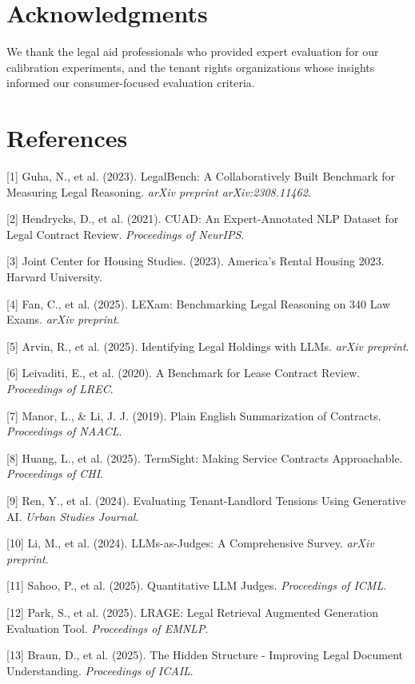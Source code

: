 \documentclass{article}
\begin{document}
\section*{Acknowledgments}

We thank the legal aid professionals who provided expert evaluation for our calibration experiments, and the tenant rights organizations whose insights informed our consumer-focused evaluation criteria.

\section*{References}

{
\small

[1] Guha, N., et al. (2023). LegalBench: A Collaboratively Built Benchmark for Measuring Legal Reasoning. \emph{arXiv preprint arXiv:2308.11462}.

[2] Hendrycks, D., et al. (2021). CUAD: An Expert-Annotated NLP Dataset for Legal Contract Review. \emph{Proceedings of NeurIPS}.

[3] Joint Center for Housing Studies. (2023). America's Rental Housing 2023. Harvard University.

[4] Fan, C., et al. (2025). LEXam: Benchmarking Legal Reasoning on 340 Law Exams. \emph{arXiv preprint}.

[5] Arvin, R., et al. (2025). Identifying Legal Holdings with LLMs. \emph{arXiv preprint}.

[6] Leivaditi, E., et al. (2020). A Benchmark for Lease Contract Review. \emph{Proceedings of LREC}.

[7] Manor, L., \& Li, J. J. (2019). Plain English Summarization of Contracts. \emph{Proceedings of NAACL}.

[8] Huang, L., et al. (2025). TermSight: Making Service Contracts Approachable. \emph{Proceedings of CHI}.

[9] Ren, Y., et al. (2024). Evaluating Tenant-Landlord Tensions Using Generative AI. \emph{Urban Studies Journal}.

[10] Li, M., et al. (2024). LLMs-as-Judges: A Comprehensive Survey. \emph{arXiv preprint}.

[11] Sahoo, P., et al. (2025). Quantitative LLM Judges. \emph{Proceedings of ICML}.

[12] Park, S., et al. (2025). LRAGE: Legal Retrieval Augmented Generation Evaluation Tool. \emph{Proceedings of EMNLP}.

[13] Braun, D., et al. (2025). The Hidden Structure - Improving Legal Document Understanding. \emph{Proceedings of ICAIL}.

}
\end{document}
